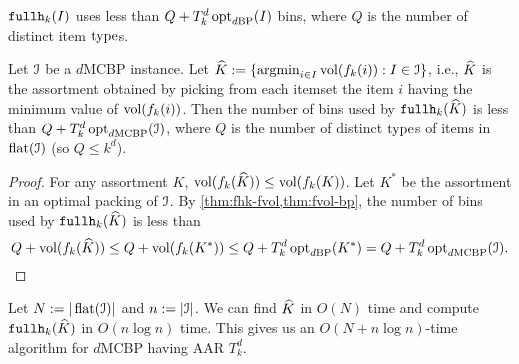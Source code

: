 \begin{lemma}
\label{thm:fhk-appx}
$\operatorname{\mathtt{fullh}}_{k}(I)$ uses less than $Q + T_k^d\operatorname{opt}_{d\mathrm{BP}}(I)$ bins,
where $Q$ is the number of distinct item $\operatorname{type}$s.
\end{lemma}

\begin{theorem}
Let $\mathcal{I}$ be a $d$MCBP instance.
Let $\widehat{K} := \{\operatorname*{argmin}_{i \in I} \operatorname{vol}(f_k(i)): I \in \mathcal{I}\}$,
i.e., $\widehat{K}$ is the assortment obtained by picking from each itemset
the item $i$ having the minimum value of $\operatorname{vol}(f_k(i))$.
Then the number of bins used by $\operatorname{\mathtt{fullh}}_{k}(\widehat{K})$ is less than $Q + T_k^d\operatorname{opt}_{d\mathrm{MCBP}}(\mathcal{I})$,
where $Q$ is the number of distinct $\operatorname{type}$s of items in $\operatorname{flat}(\mathcal{I})$ (so $Q \le k^d$).
\end{theorem}
\begin{proof}
For any assortment $K$, $\operatorname{vol}(f_k(\widehat{K})) \le \operatorname{vol}(f_k(K))$.
Let $K^*$ be the assortment in an optimal packing of $\mathcal{I}$.
By \cref{thm:fhk-fvol,thm:fvol-bp}, the number of bins used by
$\operatorname{\mathtt{fullh}}_{k}(\widehat{K})$ is less than
\[ Q + \operatorname{vol}(f_k(\widehat{K}))
\le Q + \operatorname{vol}(f_k(K^*))
\le Q + T_k^d\operatorname{opt}_{d\mathrm{BP}}(K^*)
= Q + T_k^d\operatorname{opt}_{d\mathrm{MCBP}}(\mathcal{I}).
\qedhere \]
\end{proof}

Let $N := |\operatorname{flat}(\mathcal{I})|$ and $n := |\mathcal{I}|$.
We can find $\widehat{K}$ in $O(N)$ time and compute $\operatorname{\mathtt{fullh}}_{k}(\widehat{K})$ in $O(n\log n)$ time.
This gives us an $O(N + n\log n)$-time algorithm for $d$MCBP having AAR $T_k^d$.
